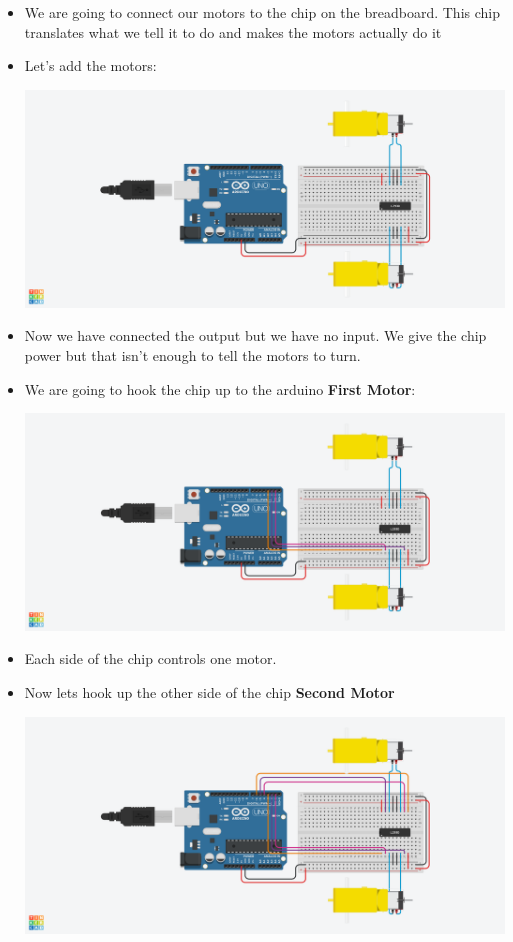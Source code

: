 \documentclass[12pt]{article}
\begin{document}
\begin{itemize}
\begin{center}
		\end{center}
		\item We are going to connect our motors to the chip on the breadboard. This chip translates what we tell it to do and makes the motors actually do it  
		\item Let's add the motors:
		\begin{center}
			\includegraphics[scale = 0.3]{./Images/circuit3}
		\end{center}
		\item Now we have connected the output but we have no input.  We give the chip power but that isn't enough to tell the motors to turn. 
		\newpage
		\item We are going to hook the chip up to the arduino \textbf{First Motor}:
		\begin{center}
			\includegraphics[scale = 0.3]{./Images/circuit4}
		\end{center}
		\item Each side of the chip controls one motor.
		\item Now lets hook up the other side of the chip \textbf{Second Motor}
		\begin{center}
			\includegraphics[scale = 0.3]{./Images/circuit5}
		\end{center}
	\end{itemize}
\end{document}

